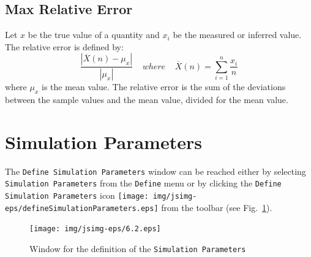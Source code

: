 \subsection{Max Relative Error}
\label{mrerr} Let $x$ be the true value of a quantity and $x_i$ be
the measured or inferred value. The relative error is defined by:
\[ \frac{|\overline{X}(n) - \mu_x|} {|\mu_x|} \;\;\;\; where
\;\;\;\;\overline{X}(n) = \sum_{i=1}^{n}  \frac{x_i}{n}\] where
$\mu_x$ is the mean value.  The relative error is the sum of the
deviations between the sample values and the mean value, divided
for the mean value.

\section{Simulation Parameters}
The \texttt{Define Simulation Parameters} window can be reached
either by selecting \texttt{Simulation Parameters} from the
\texttt{Define} menu or by clicking the \texttt{Define Simulation
Parameters} icon
\texttt{[image: img/jsimg-eps/defineSimulationParameters.eps]}
from the toolbar (see Fig.~\ref{fig:inistat}).

\begin{figure}[h]
    \begin{center}
        \texttt{[image: img/jsimg-eps/6.2.eps]}
    \end{center}
    \caption{Window for the definition of the \texttt{Simulation Parameters}}
    \label{fig:inistat}
\end{figure}

